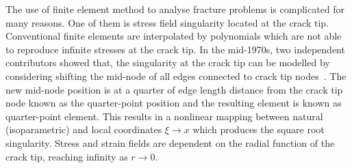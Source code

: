 \documentclass[11pt]{acmeArticle}
\numberwithin{equation}{section}
\begin{document}
The use of finite element method to analyse fracture problems is complicated for many reasons. One of them is stress field singularity located at the crack tip.
Conventional finite elements are interpolated by polynomials which are not able to reproduce infinite stresses at the crack tip. 
In the mid-1970s, two independent contributors showed that, the singularity at the crack tip can be modelled by considering shifting the mid-node of all edges connected to crack tip nodes~\citep{barsoum1976use,henshell1975crack}.
The new mid-node position is at a quarter of edge length distance from the crack tip node known as the quarter-point position and the resulting element is known as quarter-point element. 
This results in a nonlinear mapping between natural (isoparametric) and local coordinates $\xi \rightarrow x$ which produces  the square root singularity. Stress and strain fields are dependent on the radial function of the crack tip, reaching infinity as $ r \rightarrow 0$. \\


\end{document}

